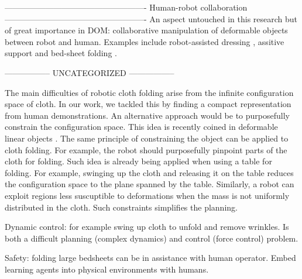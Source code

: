 \documentclass[\home/main.tex]{subfiles}
\begin{document}
 ----------------------------------------------------
    Human-robot collaboration
----------------------------------------------------
An aspect untouched in this research but of great importance in DOM: collaborative manipulation of deformable objects between robot and human. Examples include robot-assisted dressing \autocite{Gao2016}, assitive support \autocite{lu2017human} and bed-sheet folding \autocite{Kruse2015}.


-----------------
UNCATEGORIZED
----------------- 

The main difficulties of robotic cloth folding arise from the infinite configuration space of cloth. In our work, we tackled this by finding a compact representation from human demonstrations. An alternative approach would be to purposefully constrain the configuration space. This idea is recently coined in deformable linear objects \autocite{Zhu2020}. The same principle of constraining the object can be applied to cloth folding. For example, the robot should purposefully pinpoint parts of the cloth for folding. Such idea is already being applied when using a table for folding. For example, swinging up the cloth and releasing it on the table reduces the configuration space to the plane spanned by the table. Similarly, a robot can exploit regions less suscuptible to deformations when the mass is not uniformly distributed in the cloth. Such constraints simplifies the planning. 

Dynamic control: for example swing up cloth to unfold and remove wrinkles. Is both a difficult planning (complex dynamics) and control (force control) problem.


Safety: folding large bedsheets can be in assistance with human operator. Embed learning agents into physical environments with humans. 
\end{document}

